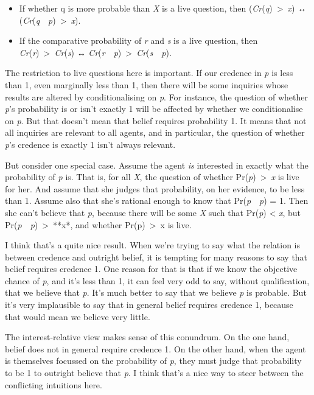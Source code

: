 \documentclass[
  10pt,
  letterpaper,
  DIV=11,
  numbers=noendperiod,
  twoside]{scrartcl}
\providecommand{\tightlist}{%
  \setlength{\itemsep}{0pt}\setlength{\parskip}{0pt}}\usepackage{longtable,booktabs,array}
\begin{document}
\begin{itemize}
\tightlist
\item
  If whether q is more probable than \emph{X} is a live question, then
  (\emph{Cr}(\emph{q})~\textgreater~\emph{x}) ↔
  (\emph{Cr}(\emph{q}~\textbar~\emph{p})~\textgreater~\emph{x}).
\item
  If the comparative probability of \emph{r} and \emph{s} is a live
  question, then \emph{Cr}(\emph{r})~\textgreater~\emph{Cr}(\emph{s}) ↔
  \emph{Cr}(\emph{r}~\textbar~\emph{p})~\textgreater~\emph{Cr}(\emph{s}~\textbar~\emph{p}).
\end{itemize}

The restriction to live questions here is important. If our credence in
\emph{p} is less than 1, even marginally less than 1, then there will be
some inquiries whose results are altered by conditionalising on
\emph{p}. For instance, the question of whether \emph{p}'s probability
is or isn't exactly 1 will be affected by whether we conditionalise on
\emph{p}. But that doesn't mean that belief requires probability 1. It
means that not all inquiries are relevant to all agents, and in
particular, the question of whether \emph{p}'s credence is exactly 1
isn't always relevant.

But consider one special case. Assume the agent \emph{is} interested in
exactly what the probability of \emph{p} is. That is, for all \emph{X},
the question of whether Pr(\emph{p})~\textgreater~\emph{x} is live for
her. And assume that she judges that probability, on her evidence, to be
less than 1. Assume also that she's rational enough to know that
Pr(\emph{p}~\textbar~\emph{p}) = 1. Then she can't believe that
\emph{p}, because there will be some \emph{X} such that Pr(\emph{p})
\textless{} \emph{x}, but
Pr(\emph{p}~\textbar~\emph{p})~\textgreater~**x*, and whether
Pr(p)~\textgreater~x is live.

I think that's a quite nice result. When we're trying to say what the
relation is between credence and outright belief, it is tempting for
many reasons to say that belief requires credence 1. One reason for that
is that if we know the objective chance of \emph{p}, and it's less than
1, it can feel very odd to say, without qualification, that we believe
that \emph{p}. It's much better to say that we believe \emph{p} is
probable. But it's very implausible to say that in general belief
requires credence 1, because that would mean we believe very little.

The interest-relative view makes sense of this conundrum. On the one
hand, belief does not in general require credence 1. On the other hand,
when the agent is themselves focussed on the probability of \emph{p},
they must judge that probability to be 1 to outright believe that
\emph{p}. I think that's a nice way to steer between the conflicting
intuitions here.
\end{document}

